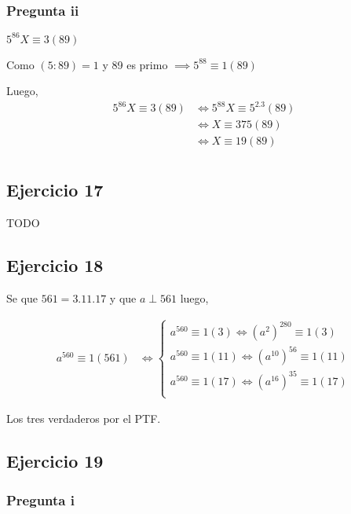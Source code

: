 \subsubsection{Pregunta ii}

$ 5^{86}X \equiv 3(89) $

Como $ (5:89) = 1 $ y 89 es primo $ \implies 5^{88} \equiv 1(89) $

Luego,
\begin{align*}
    5^{86}X \equiv 3(89) &\iff 5^{88}X \equiv 5^2.3(89) \\
    &\iff X \equiv 375(89) \\
    &\iff X \equiv 19(89) \\
\end{align*}

\subsection{Ejercicio 17}
TODO

\subsection{Ejercicio 18}

Se que $ 561 = 3.11.17 $ y que $ a \perp 561 $ luego,

\begin{align*}
    a^{560} \equiv 1(561) &\iff \begin{cases}
        a^{560}\equiv 1(3) \iff (a^2)^{280} \equiv 1(3) \\
        a^{560}\equiv 1(11) \iff (a^{10})^{56} \equiv 1(11) \\
        a^{560}\equiv 1(17) \iff (a^{16})^{35} \equiv 1(17) \\
    \end{cases}
\end{align*}

Los tres verdaderos por el PTF.

\subsection{Ejercicio 19}

\subsubsection{Pregunta i}

